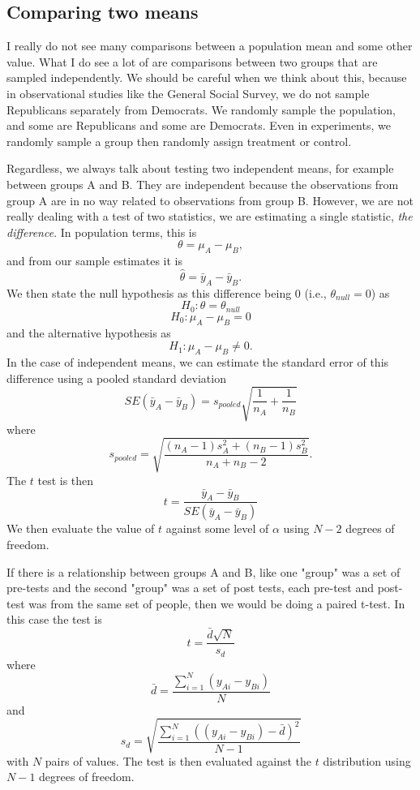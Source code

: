 \subsection{Comparing two means}
\label{sec:pooled}
I really do not see many comparisons between a population mean and some other value. What I do see a lot of are comparisons between two groups that are sampled independently. We should be careful when we think about this, because in observational studies like the General Social Survey, we do not sample Republicans separately from Democrats. We randomly sample the population, and some are Republicans and some are Democrats. Even in experiments, we randomly sample a group then randomly assign treatment or control.

Regardless, we always talk about testing two independent means, for example between groups A and B. They are independent because the observations from group A are in no way related to observations from group B. However, we are not really dealing with a test of two statistics, we are estimating a single statistic, {\it the difference}. In population terms, this is
\[
\theta=\mu_A-\mu_B,
\]
and from our sample estimates it is
\[
\hat{\theta}=\bar{y}_A-\bar{y}_B.
\]
We then state the null hypothesis as this difference being 0 (i.e., $\theta_{null} = 0$) as
\[
H_0:\theta=\theta_{null}
\]
\[
H_0:\mu_A-\mu_B=0
\]
and the alternative hypothesis as
\[
H_1:\mu_A-\mu_B\ne0.
\]
In the case of independent means, we can estimate the standard error of this difference using a pooled standard deviation
\begin{equation}
SE\left(\bar{y}_A-\bar{y}_B\right)=s_{pooled}\sqrt{\frac{1}{n_A}+\frac{1}{n_B}}
\end{equation}
where
\begin{equation}
s_{pooled} = \sqrt{\frac{\left(n_A-1\right)s_A^2+\left(n_B-1\right)s_B^2}{n_A+n_B-2}}.
\end{equation}
The $t$ test is then
\begin{equation}
t = \frac{\bar{y}_A-\bar{y}_B}{SE\left(\bar{y}_A-\bar{y}_B\right)}
\end{equation}
We then evaluate the value of $t$ against some level of $\alpha$ using $N-2$ degrees of freedom.

If there is a relationship between groups A and B, like one "group" was a set of pre-tests and the second "group" was a set of post tests, each pre-test and post-test was from the same set of people, then we would be doing a paired t-test. In this case the test is
\begin{equation}
t=\frac{\bar{d}\sqrt{N}}{s_d}
\end{equation}
where
\begin{equation}
\bar{d} = \frac{\sum_{i=1}^N\left(y_{Ai}-y_{Bi}\right)}{N}
\end{equation}
and
\begin{equation}
s_d = \sqrt{\frac{\sum_{i=1}^N\left(\left(y_{Ai}-y_{Bi}\right)-\bar{d}\right)^2}{N-1}}
\end{equation}
with $N$ pairs of values. The test is then evaluated against the $t$ distribution using $N-1$ degrees of freedom.

